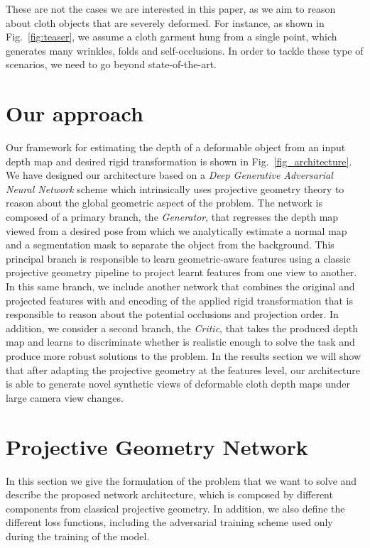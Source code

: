 These are not the cases we are interested in this paper, as we aim to reason about cloth objects that are severely deformed. 
For instance, as shown in Fig.~\ref{fig:teaser}, we assume a cloth garment hung from a single point, which generates many wrinkles, folds and self-occlusions. In order to tackle these type of scenarios, we need to go beyond state-of-the-art.

\section{Our approach}
Our framework for estimating the depth of a deformable object from an input depth map and desired rigid transformation is shown in Fig.~\ref{fig_architecture}. We have designed our architecture based on a \textit{Deep Generative Adversarial Neural Network} scheme which intrinsically uses projective geometry theory to reason about the global geometric aspect of the problem. The network is composed of a primary branch, the \textit{Generator}, that regresses the depth map viewed from   a desired pose from which we analytically estimate a normal map and a segmentation mask to separate the object from the background. This principal branch is responsible to learn geometric-aware features using a classic projective geometry pipeline to project learnt features from one view to another. In this same branch, we include another network that combines the original and projected features with and encoding of the applied rigid transformation that is responsible to reason about the potential occlusions and projection order. In addition, we consider a second branch, the \textit{Critic}, that takes the produced depth map and learns to discriminate whether is realistic enough to solve the task and produce more robust solutions to the problem. In the results section we will show that after adapting the projective geometry at the features level, our architecture is able to generate novel synthetic views of deformable cloth depth maps under large camera view changes.


\section{Projective Geometry Network}
In this section we give the formulation of the problem that we want to solve and describe the proposed network architecture, which is composed by different components from classical projective geometry. In addition, we also define the different loss functions, including the adversarial training scheme used only during the training of the model.

